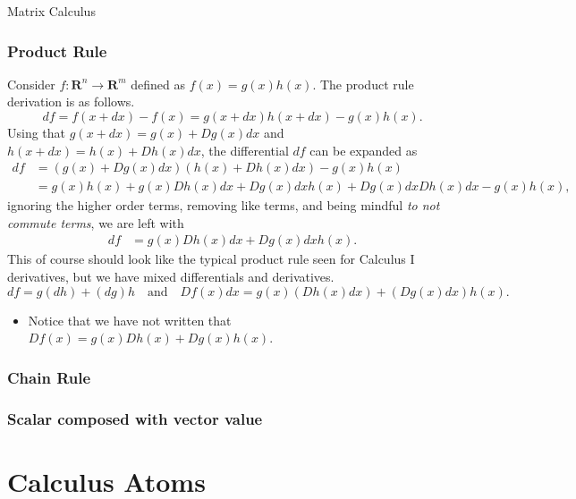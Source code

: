 \begin{chapter}{Matrix Calculus}
    \subsubsection{Product Rule}
    Consider $f: \mathbf{R}^n \to \mathbf{R}^m$ defined as $f(x) = g(x)h(x)$. The product rule
    derivation is as follows.
    \[df = f(x + dx) - f(x) = g(x + dx)h(x + dx) - g(x)h(x).\]
    Using that $g(x + dx) = g(x) + Dg(x)dx$ and $h(x + dx) = h(x) + Dh(x)dx$, 
    the differential $df$ can be expanded as
    \[\begin{aligned}
        df &= \left(g(x) + Dg(x)dx \right) \left(h(x) + Dh(x)dx\right) - g(x)h(x) \\
        &= g(x)h(x) + g(x)Dh(x)dx + Dg(x)dxh(x) + Dg(x)dxDh(x)dx - g(x)h(x),
    \end{aligned}\]
    ignoring the higher order terms, removing like terms, and being mindful \textit{to not commute terms},
    we are left with
    \[\begin{aligned}
        df &= g(x)Dh(x)dx + Dg(x)dxh(x).
    \end{aligned}\]
    This of course should look like the typical product rule seen for Calculus I derivatives,
    but we have mixed differentials and derivatives. 
    \[df = g (dh) + (dg)h \quad \text{and} \quad Df(x)dx = g(x)\left(Dh(x)dx\right) + \left(Dg(x)dx\right) h(x).\]
    \begin{itemize}
        \item Notice that we have not written that $Df(x) = g(x)Dh(x) + Dg(x) h(x)$.
    \end{itemize}

    \subsubsection{Chain Rule}

    \subsubsection{Scalar composed with vector value}

    \section{Calculus Atoms}



\end{chapter}
